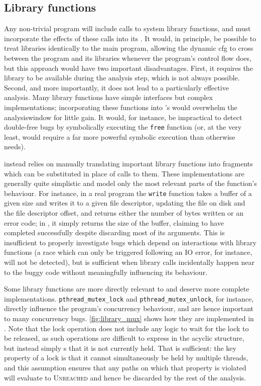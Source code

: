 \subsection{Library functions}
\label{sect:derive:library_functions}

Any non-trivial program will include calls to system library
functions, and {\technique} must incorporate the effects of these
calls into its {\StateMachines}.  It would, in principle, be possible
to treat libraries identically to the main program, allowing the
\gls{dynamic cfg} to cross between the program and its libraries
whenever the program's control flow does, but this approach would have
two important disadvantages.  First, it requires the library to be
available during the analysis step, which is not always possible.
Second, and more importantly, it does not lead to a particularly
effective analysis.  Many library functions have simple interfaces but
complex implementations; incorporating these functions into
{\technique}'s {\StateMachines} would overwhelm the
\gls{analysiswindow} for little gain.  It would, for instance, be
impractical to detect double-free bugs by symbolically executing the
\texttt{free} function (or, at the very least, would require a far
more powerful symbolic execution than {\technique} otherwise needs).

{\Technique} instead relies on manually translating important library
functions into {\StateMachine} fragments which can be substituted in
place of calls to them.  These implementations are generally quite
simplistic and model only the most relevant parts of the function's
behaviour.  For instance, in a real program the \texttt{write}
function takes a buffer of a given size and writes it to a given file
descriptor, updating the file on disk and the file descriptor offset,
and returns either the number of bytes written or an error code; in
{\atechnique} {\StateMachine}, it simply returns the size of the
buffer, claiming to have completed successfully despite discarding
most of its arguments.  This is insufficient to properly investigate
bugs which depend on interactions with library functions (a race which
can only be triggered following an IO error, for instance, will not be
detected), but is sufficient when library calls incidentally happen
near to the buggy code without meaningfully influencing its behaviour.

Some library functions are more directly relevant to {\technique} and
deserve more complete implementations.  \texttt{pthread\_mutex\_lock}
and \texttt{pthread\_mutex\_unlock}, for instance, directly influence
the program's concurrency behaviour, and are hence important to many
concurrency bugs.  \autoref{fig:library_mux} shows how they are
implemented in {\technique}.  Note that the lock operation does not
include any logic to wait for the lock to be released, as such
operations are difficult to express in the acyclic {\StateMachine}
structure, but instead simply {\stAssertN}s that it is not currently
held.  That is sufficient: the key property of a lock is that it
cannot simultaneously be held by multiple threads, and this assumption
ensures that any paths on which that property is violated will
evaluate to \textsc{Unreached} and hence be discarded by the rest of
the analysis.


